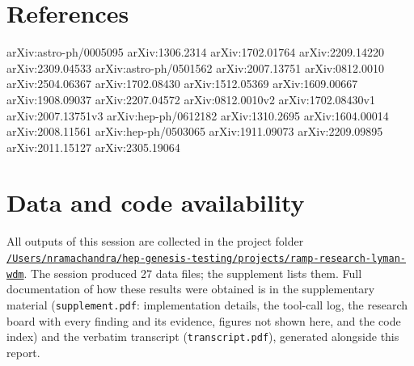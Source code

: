 \documentclass[11pt,a4paper]{article}
\begin{document}
\section*{References}
arXiv:astro-ph/0005095 arXiv:1306.2314 arXiv:1702.01764 arXiv:2209.14220 arXiv:2309.04533 arXiv:astro-ph/0501562 arXiv:2007.13751 arXiv:0812.0010 arXiv:2504.06367 arXiv:1702.08430 arXiv:1512.05369 arXiv:1609.00667 arXiv:1908.09037 arXiv:2207.04572 arXiv:0812.0010v2 arXiv:1702.08430v1 arXiv:2007.13751v3 arXiv:hep-ph/0612182 arXiv:1310.2695 arXiv:1604.00014 arXiv:2008.11561 arXiv:hep-ph/0503065 arXiv:1911.09073 arXiv:2209.09895 arXiv:2011.15127 arXiv:2305.19064


\section*{Data and code availability}
All outputs of this session are collected in the project folder \href{file:///Users/nramachandra/hep-genesis-testing/projects/ramp-research-lyman-wdm}{\texttt{/\allowbreak{}Users/\allowbreak{}nramachandra/\allowbreak{}hep-genesis-testing/\allowbreak{}projects/\allowbreak{}ramp-research-lyman-wdm}}.
The session produced 27 data files; the supplement lists them.
Full documentation of how these results were obtained is in the supplementary material (\texttt{supplement.pdf}: implementation details, the tool-call log, the research board with every finding and its evidence, figures not shown here, and the code index) and the verbatim transcript (\texttt{transcript.pdf}), generated alongside this report.
\end{document}

